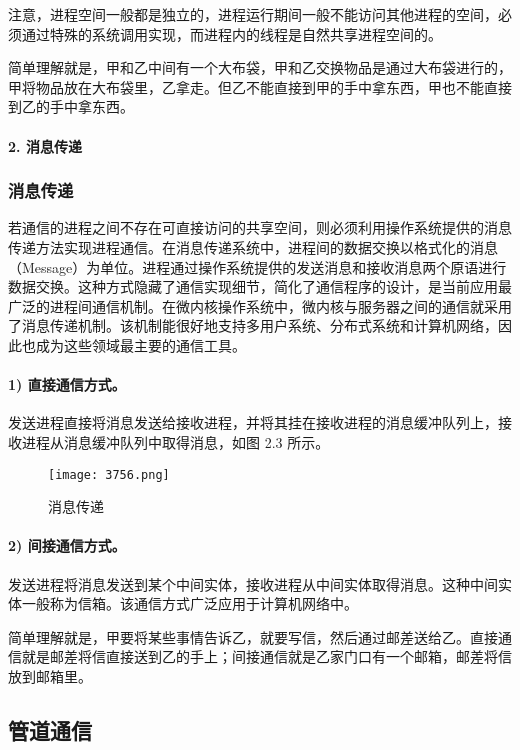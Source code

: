 \documentclass{ctexbook}
\begin{document}
	注意，进程空间一般都是独立的，进程运行期间一般不能访问其他进程的空间，必须通过特殊的系统调用实现，而进程内的线程是自然共享进程空间的。
	
	简单理解就是，甲和乙中间有一个大布袋，甲和乙交换物品是通过大布袋进行的，甲将物品放在大布袋里，乙拿走。但乙不能直接到甲的手中拿东西，甲也不能直接到乙的手中拿东西。
	
	\paragraph{2. 消息传递}
	
	\subsubsection{消息传递}
	
	若通信的进程之间不存在可直接访问的共享空间，则必须利用操作系统提供的消息传递方法实现进程通信。在消息传递系统中，进程间的数据交换以格式化的消息（Message）为单位。进程通过操作系统提供的发送消息和接收消息两个原语进行数据交换。这种方式隐藏了通信实现细节，简化了通信程序的设计，是当前应用最广泛的进程间通信机制。在微内核操作系统中，微内核与服务器之间的通信就采用了消息传递机制。该机制能很好地支持多用户系统、分布式系统和计算机网络，因此也成为这些领域最主要的通信工具。
	
	\paragraph{1) 直接通信方式。}
	发送进程直接将消息发送给接收进程，并将其挂在接收进程的消息缓冲队列上，接收进程从消息缓冲队列中取得消息，如图 2.3 所示。
	
	\begin{figure}[h]
		\centering
		\texttt{[image: 3756.png]}
		\caption{消息传递}
		\label{fig:message_passing}
	\end{figure}
	
	\paragraph{2) 间接通信方式。}
	发送进程将消息发送到某个中间实体，接收进程从中间实体取得消息。这种中间实体一般称为信箱。该通信方式广泛应用于计算机网络中。
	
	简单理解就是，甲要将某些事情告诉乙，就要写信，然后通过邮差送给乙。直接通信就是邮差将信直接送到乙的手上；间接通信就是乙家门口有一个邮箱，邮差将信放到邮箱里。
	
	\subsection{管道通信}
	
\end{document}
